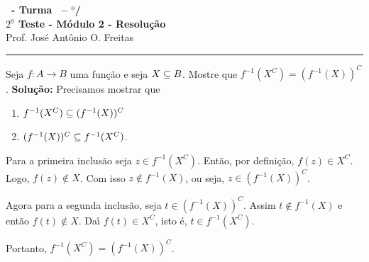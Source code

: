 \documentclass[12pt]{exam}
\begin{document}
\begin{center}
{\Large\bf \disciplina\ - Turma \turma\ -- \semestre$^{o}$/\ano} \\ \vspace{9pt} {\large\bf
$2^{\underline{o}}$ Teste - M\'odulo 2 - Resolu\c{c}\~ao}\\
\vspace{9pt} Prof. Jos{\'e} Ant{\^o}nio O. Freitas
\end{center}
\hrule

\vspace{.6cm}

\questao Seja $f : A \to B$ uma fun{\c c}{\~a}o e seja $X \subseteq B$. Mostre que $f^{-1}(X^C) = (f^{-1}(X))^C$.
\noindent\textbf{Solu\c{c}\~ao:} Precisamos mostrar que
\begin{enumerate}[label={\roman*})]
    \item $f^{-1}(X^C) \subseteq (f^{-1}(X))^C$
    \item $(f^{-1}(X))^C \subseteq f^{-1}(X^C)$.
\end{enumerate}

Para a primeira inclus\~ao seja $z \in f^{-1}(X^C)$. Ent\~ao, por defini\c{c}\~ao, $f(z) \in X^C$. Logo, $f(z) \notin X$. Com isso $z \notin f^{-1}(X)$, ou seja, $z \in (f^{-1}(X))^C$.

Agora para a segunda inclus\~ao, seja $t \in (f^{-1}(X))^C$. Assim $t \notin f^{-1}(X)$ e ent\~ao $f(t) \notin X$. Da{\'\i} $f(t) \in X^C$, isto \'e, $t \in f^{-1}(X^C)$.

Portanto, $f^{-1}(X^C) = (f^{-1}(X))^C$.


\vspace{.5cm}
\end{document}
